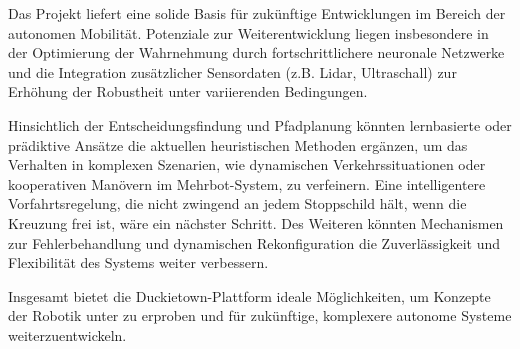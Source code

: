 Das Projekt liefert eine solide Basis für zukünftige Entwicklungen im Bereich der autonomen Mobilität. Potenziale zur Weiterentwicklung liegen insbesondere in der Optimierung der Wahrnehmung durch fortschrittlichere neuronale Netzwerke und die Integration zusätzlicher Sensordaten (z.B. Lidar, Ultraschall) zur Erhöhung der Robustheit unter variierenden Bedingungen.

Hinsichtlich der Entscheidungsfindung und Pfadplanung könnten lernbasierte oder prädiktive Ansätze die aktuellen heuristischen Methoden ergänzen, um das Verhalten in komplexen Szenarien, wie dynamischen Verkehrssituationen oder kooperativen Manövern im Mehrbot-System, zu verfeinern. Eine intelligentere Vorfahrtsregelung, die nicht zwingend an jedem Stoppschild hält, wenn die Kreuzung frei ist, wäre ein nächster Schritt. Des Weiteren könnten Mechanismen zur Fehlerbehandlung und dynamischen Rekonfiguration die Zuverlässigkeit und Flexibilität des Systems weiter verbessern.

Insgesamt bietet die Duckietown-Plattform ideale Möglichkeiten, um Konzepte der Robotik unter zu erproben und für zukünftige, komplexere autonome Systeme weiterzuentwickeln.



